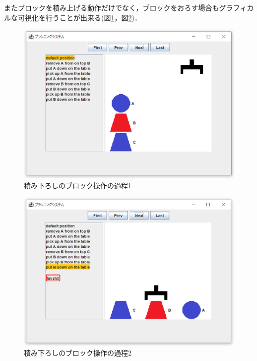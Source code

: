 \documentclass[uplatex,12pt]{jsarticle}
\begin{document}
\clearpage
またブロックを積み上げる動作だけでなく，ブロックをおろす場合もグラフィカルな可視化を行うことが出来る(図\ref{fig:page14}，図\ref{fig:page16})．
\begin{figure}[htbp]
  \begin{center}
    \includegraphics[scale=0.49]{images/page14.PNG}
    \caption{積み下ろしのブロック操作の過程1}
    \label{fig:page14}
  \end{center}
\end{figure}
\begin{figure}[htbp]
  \begin{center}
    \includegraphics[scale=0.49]{images/page16.PNG}
    \caption{積み下ろしのブロック操作の過程2}
    \label{fig:page16}
  \end{center}
\end{figure}
\end{document}
